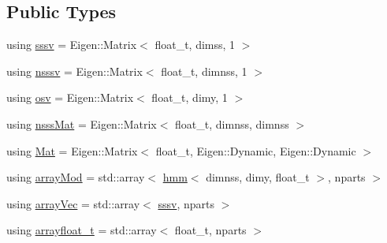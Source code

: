 \subsection*{Public Types}
\begin{DoxyCompactItemize}
\item 
using \hyperlink{classrbpf__hmm__bs_a9a1c8d64f693a34a902dbfcb009d0f96}{sssv} = Eigen\+::\+Matrix$<$ float\+\_\+t, dimss, 1 $>$
\item 
using \hyperlink{classrbpf__hmm__bs_a98c86f40e4ca55ff16156077b11032ca}{nsssv} = Eigen\+::\+Matrix$<$ float\+\_\+t, dimnss, 1 $>$
\item 
using \hyperlink{classrbpf__hmm__bs_a6ec23f9c6eff96f8967c3c451c32b772}{osv} = Eigen\+::\+Matrix$<$ float\+\_\+t, dimy, 1 $>$
\item 
using \hyperlink{classrbpf__hmm__bs_aa6ea87fa04659348fa4e4a52b97edc5c}{nsss\+Mat} = Eigen\+::\+Matrix$<$ float\+\_\+t, dimnss, dimnss $>$
\item 
using \hyperlink{classrbpf__hmm__bs_aa0bd79c7ece59908ed08c51da3d67dad}{Mat} = Eigen\+::\+Matrix$<$ float\+\_\+t, Eigen\+::\+Dynamic, Eigen\+::\+Dynamic $>$
\item 
using \hyperlink{classrbpf__hmm__bs_aa91b72fcbb93f89eade623504eaac11b}{array\+Mod} = std\+::array$<$ \hyperlink{classhmm}{hmm}$<$ dimnss, dimy, float\+\_\+t $>$, nparts $>$
\item 
using \hyperlink{classrbpf__hmm__bs_a073f5b7f5015d394259510b20f693a19}{array\+Vec} = std\+::array$<$ \hyperlink{classrbpf__hmm__bs_a9a1c8d64f693a34a902dbfcb009d0f96}{sssv}, nparts $>$
\item 
using \hyperlink{classrbpf__hmm__bs_aa2dd927bb65838210f0d177b360606dc}{arrayfloat\+\_\+t} = std\+::array$<$ float\+\_\+t, nparts $>$
\end{DoxyCompactItemize}
